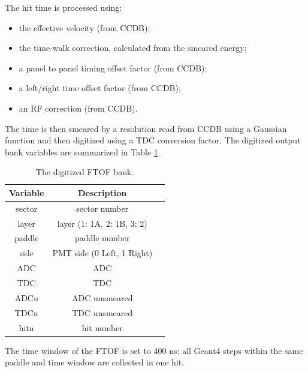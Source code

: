 The hit time is processed using:

\begin{itemize}
	\item the effective velocity (from CCDB);
	\item the time-walk correction, calculated from the smeared energy;
	\item a panel to panel timing offset factor (from CCDB);
	\item a left/right time offset factor (from CCDB);
	\item an RF correction (from CCDB).
\end{itemize}

The time is then smeared by a resolution read from CCDB using a Gaussian function and then digitized using a TDC conversion factor.
The digitized output bank variables are summarized in Table \ref{tab:ftofBank}.

\begin{table}[h]
	\begin{center}
		\begin{tabular}{| c | c | c |}
			\hline \hline
			Variable  & Description                                 \\
			\hline
              sector  &                             sector number   \\
               layer  &               layer (1: 1A, 2: 1B, 3: 2)   \\
              paddle  &                             paddle number   \\
                side  &                PMT side (0 Left, 1 Right)   \\
                 ADC  &                                       ADC   \\
                 TDC  &                                       TDC   \\
                ADCu  &                             ADC unsmeared   \\
                TDCu  &                             TDC unsmeared   \\
                hitn  &                                hit number   \\
			\hline \hline
		\end{tabular}
	\end{center}
	\caption{The digitized FTOF bank.}\label{tab:ftofBank}
\end{table}


The time window  of the FTOF is set to 400 ns: all Geant4 steps within the same paddle and time window are collected in one hit.



